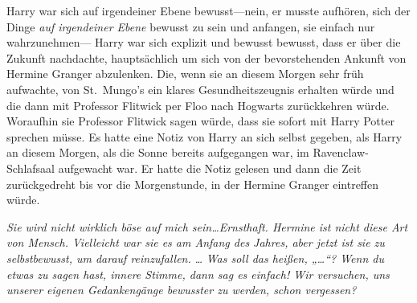 Harry war sich auf irgendeiner Ebene bewusst—nein, er musste aufhören, sich der Dinge \emph{auf irgendeiner Ebene} bewusst zu sein und anfangen, sie einfach nur wahrzunehmen— Harry war sich explizit und bewusst bewusst, dass er über die Zukunft nachdachte, hauptsächlich um sich von der bevorstehenden Ankunft von Hermine Granger abzulenken. Die, wenn sie an diesem Morgen sehr früh aufwachte, von St.~Mungo’s ein klares Gesundheitszeugnis erhalten würde und die dann mit Professor Flitwick per Floo nach Hogwarts zurückkehren würde. Woraufhin sie Professor Flitwick sagen würde, dass sie sofort mit Harry Potter sprechen müsse. Es hatte eine Notiz von Harry an sich selbst gegeben, als Harry an diesem Morgen, als die Sonne bereits aufgegangen war, im Ravenclaw-Schlafsaal aufgewacht war. Er hatte die Notiz gelesen und dann die Zeit zurückgedreht bis vor die Morgenstunde, in der Hermine Granger eintreffen würde.

\emph{Sie wird nicht wirklich böse auf mich sein…Ernsthaft. Hermine ist nicht diese Art von Mensch. Vielleicht war sie es am Anfang des Jahres, aber jetzt ist sie zu selbstbewusst, um darauf reinzufallen.}
\emph{…}
\emph{Was soll das heißen, „…“? Wenn du etwas zu sagen hast, innere Stimme, dann sag es einfach! Wir versuchen, uns unserer eigenen Gedankengänge bewusster zu werden, schon vergessen?}

\later

